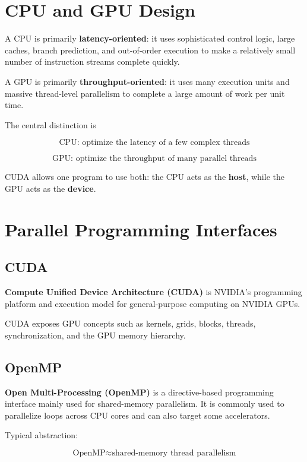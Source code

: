 \documentclass[11pt,a4paper]{article}
\begin{document}
\section{CPU and GPU Design}

A CPU is primarily \textbf{latency-oriented}: it uses sophisticated control logic, large caches, branch prediction, and out-of-order execution to make a relatively small number of instruction streams complete quickly.

A GPU is primarily \textbf{throughput-oriented}: it uses many execution units and massive thread-level parallelism to complete a large amount of work per unit time.

The central distinction is

\[
\boxed{\text{CPU: optimize the latency of a few complex threads}}
\]

\[
\boxed{\text{GPU: optimize the throughput of many parallel threads}}
\]

CUDA allows one program to use both: the CPU acts as the \textbf{host}, while the GPU acts as the \textbf{device}.

\section{Parallel Programming Interfaces}

\subsection{CUDA}

\textbf{Compute Unified Device Architecture (CUDA)} is NVIDIA's programming platform and execution model for general-purpose computing on NVIDIA GPUs.

CUDA exposes GPU concepts such as kernels, grids, blocks, threads, synchronization, and the GPU memory hierarchy.

\subsection{OpenMP}

\textbf{Open Multi-Processing (OpenMP)} is a directive-based programming interface mainly used for shared-memory parallelism. It is commonly used to parallelize loops across CPU cores and can also target some accelerators.

Typical abstraction:

\[
\boxed{\text{OpenMP} \approx \text{shared-memory thread parallelism}}
\]
\end{document}
